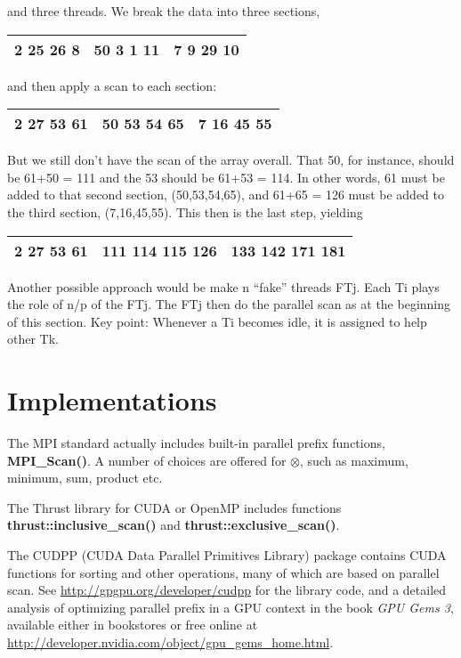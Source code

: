 and three threads.  We break the data into three sections,

\begin{tabular}{|c|c|c|}
\hline
2 25 26 8 &  50 3 1 11 & 7 9 29 10 \\ \hline
\end{tabular}

and then apply a scan to each section:

\begin{tabular}{|c|c|c|}
\hline
2 27 53 61 &  50 53 54 65 & 7 16 45 55 \\ \hline
\end{tabular}

But we still don't have the scan of the array overall.  That 50, for
instance, should be 61+50 = 111 and the 53 should be 61+53 = 114.  In
other words, 61 must be added to that second section, (50,53,54,65), and
61+65 = 126 must be added to the third section, (7,16,45,55).  This
then is the last step, yielding

\begin{tabular}{|c|c|c|}
\hline
2 27 53 61 &  111 114 115 126 & 133 142 171 181 \\ \hline
\end{tabular}

Another possible approach would be make n ``fake'' threads FTj.  Each Ti
plays the role of n/p of the FTj.  The FTj then do the parallel scan as
at the beginning of this section.  Key point:  Whenever a Ti becomes
idle, it is assigned to help other Tk.

\section{Implementations}
\label{prefiximps}

The MPI standard actually includes built-in parallel prefix functions,
{\bf MPI\_Scan()}.  A number of choices are offered for $\otimes$, such
as maximum, minimum, sum, product etc.

The Thrust library for CUDA or OpenMP includes functions {\bf
thrust::inclusive\_scan()} and {\bf thrust::exclusive\_scan()}.

The CUDPP (CUDA Data Parallel Primitives Library) package contains CUDA
functions for sorting and other operations, many of which are based on
parallel scan.  See \url{http://gpgpu.org/developer/cudpp} for the
library code, and a detailed analysis of optimizing parallel prefix in a
GPU context in the book {\it GPU Gems 3}, available either in bookstores
or free online at
\url{http://developer.nvidia.com/object/gpu_gems_home.html}.

